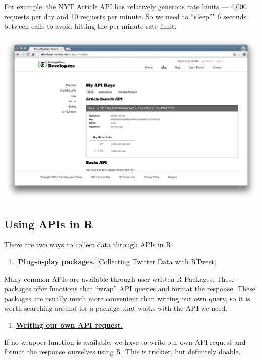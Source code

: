 \documentclass[
]{book}
\providecommand{\tightlist}{%
  \setlength{\itemsep}{0pt}\setlength{\parskip}{0pt}}
\begin{document}
For example, the NYT Article API has relatively generous rate limits --- 4,000 requests per day and 10 requests per minute. So we need to ``sleep''" 6 seconds between calls to avoid hitting the per minute rate limit.

\begin{center}\includegraphics[width=0.7\linewidth]{img/nytimes_key} \end{center}

\hypertarget{using-apis-in-r}{%
\subsection{Using APIs in R}\label{using-apis-in-r}}

There are two ways to collect data through APIs in R:

\begin{enumerate}
\def\labelenumi{\arabic{enumi}.}
\tightlist
\item
  {[}\textbf{Plug-n-play packages.}{]}{[}Collecting Twitter Data with RTweet{]}
\end{enumerate}

Many common APIs are available through user-written R Packages. These packages offer functions that ``wrap'' API queries and format the response. These packages are usually much more convenient than writing our own query, so it is worth searching around for a package that works with the API we need.

\begin{enumerate}
\def\labelenumi{\arabic{enumi}.}
\setcounter{enumi}{1}
\tightlist
\item
  \protect\hyperlink{writing-api-queries}{\textbf{Writing our own API request.}}
\end{enumerate}

If no wrapper function is available, we have to write our own API request and format the response ourselves using R. This is trickier, but definitely doable.
\end{document}
